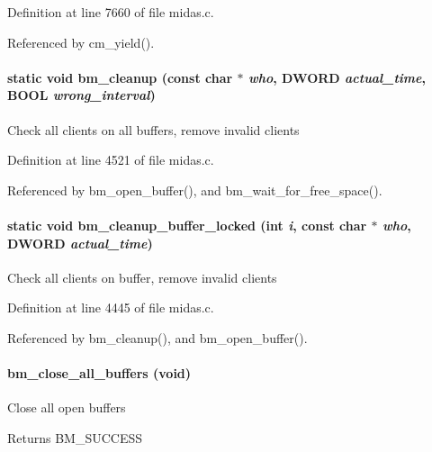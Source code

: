 Definition at line 7660 of file midas.c.

Referenced by cm\_\-yield().
\paragraph[{bm\_\-cleanup}]{\setlength{\rightskip}{0pt plus 5cm}static void bm\_\-cleanup (const char $\ast$ {\em who}, \/  {\bf DWORD} {\em actual\_\-time}, \/  {\bf BOOL} {\em wrong\_\-interval})}\hfill\label{group__bmfunctionc_ga7ea560e34b23fa5fbf9596c2cc9d156d}
Check all clients on all buffers, remove invalid clients 

Definition at line 4521 of file midas.c.

Referenced by bm\_\-open\_\-buffer(), and bm\_\-wait\_\-for\_\-free\_\-space().
\paragraph[{bm\_\-cleanup\_\-buffer\_\-locked}]{\setlength{\rightskip}{0pt plus 5cm}static void bm\_\-cleanup\_\-buffer\_\-locked (int {\em i}, \/  const char $\ast$ {\em who}, \/  {\bf DWORD} {\em actual\_\-time})}\hfill\label{group__bmfunctionc_ga6a2a39a8d4d4a0302ec443762e7a34b4}
Check all clients on buffer, remove invalid clients 

Definition at line 4445 of file midas.c.

Referenced by bm\_\-cleanup(), and bm\_\-open\_\-buffer().
\paragraph[{bm\_\-close\_\-all\_\-buffers}]{ bm\_\-close\_\-all\_\-buffers (void)}\hfill\label{group__bmfunctionc_ga3a2dae045156606fc157e01a82983a25}
Close all open buffers \begin{DoxyReturn}{Returns}
BM\_\-SUCCESS 
\end{DoxyReturn}


